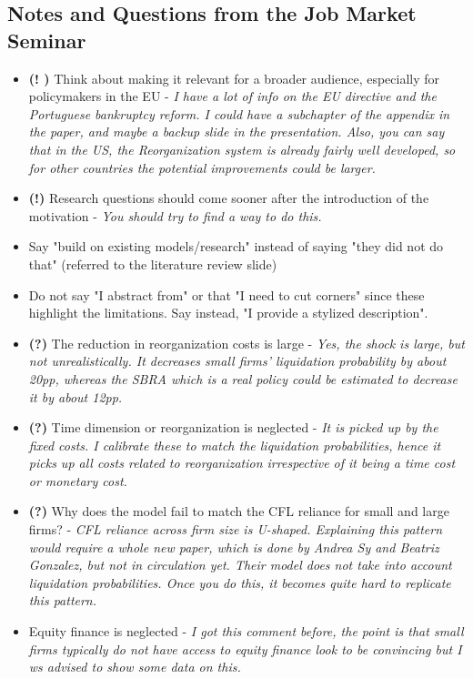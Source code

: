 \documentclass[12pt]{article}
\begin{document}
\subsection*{Notes and Questions from the Job Market Seminar}
\begin{itemize} \setlength\itemsep{0em}  \small
    \item \textbf{(! \checkmark)} Think about making it relevant for a broader audience, especially for policymakers in the EU - \textit{I have a lot of info on the EU directive and the Portuguese bankruptcy reform. I could have a subchapter of the appendix in the paper, and maybe a backup slide in the presentation. Also, you can say that in the US, the Reorganization system is already fairly well developed, so for other countries the potential improvements could be larger.}
    \item \textbf{(!)} Research questions should come sooner after the introduction of the motivation - \textit{You should try to find a way to do this.}
    \item Say "build on existing models/research" instead of saying "they did not do that" (referred to the literature review slide)
    \item Do not say "I abstract from" or that "I need to cut corners" since these highlight the limitations. Say instead, "I provide a stylized description".
    \item \textbf{(?)}  The reduction in reorganization costs is large - \textit{Yes, the shock is large, but not unrealistically. It decreases small firms' liquidation probability by about 20pp, whereas the SBRA which is a real policy could be estimated to decrease it by about 12pp.}
    \item \textbf{(?)}  Time dimension or reorganization is neglected - \textit{It is picked up by the fixed costs. I calibrate these to match the liquidation probabilities, hence it picks up all costs related to reorganization irrespective of it being a time cost or monetary cost.}
    \item \textbf{(?)} Why does the model fail to match the CFL reliance for small and large firms? - \textit{CFL reliance across firm size is U-shaped. Explaining this pattern would require a whole new paper, which is done by Andrea Sy and Beatriz Gonzalez, but not in circulation yet. Their model does not take into account liquidation probabilities. Once you do this, it becomes quite hard to replicate this pattern.}
    \item Equity finance is neglected - \textit{I got this comment before, the point is that small firms typically do not have access to equity finance look to be convincing but I ws advised to show some data on this.}
\end{itemize} \normalsize
\end{document}
